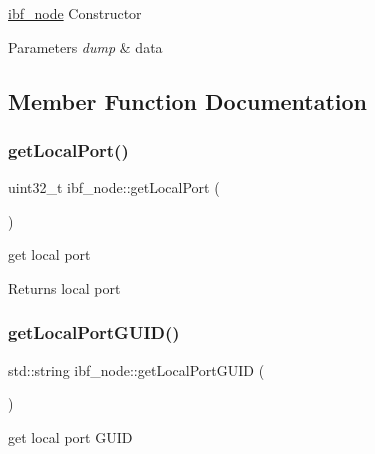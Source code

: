 \mbox{\hyperlink{classibf__node}{ibf\+\_\+node}} Constructor 


\begin{DoxyParams}{Parameters}
{\em dump} & data \\
\hline
\end{DoxyParams}


\subsection{Member Function Documentation}
\mbox{\label{classibf__node_a1edc2663a50b193be7b9a615cc288837}} 
\subsubsection{\texorpdfstring{get\+Local\+Port()}{getLocalPort()}}
{\footnotesize\ttfamily uint32\+\_\+t ibf\+\_\+node\+::get\+Local\+Port (\begin{DoxyParamCaption}{ }\end{DoxyParamCaption})\hspace{0.3cm}{\ttfamily [inline]}}



get local port 

\begin{DoxyReturn}{Returns}
local port 
\end{DoxyReturn}
\mbox{\label{classibf__node_a286ee4769949a09e9bcbdbc88d9a820c}} 
\subsubsection{\texorpdfstring{get\+Local\+Port\+G\+U\+I\+D()}{getLocalPortGUID()}}
{\footnotesize\ttfamily std\+::string ibf\+\_\+node\+::get\+Local\+Port\+G\+U\+ID (\begin{DoxyParamCaption}{ }\end{DoxyParamCaption})\hspace{0.3cm}{\ttfamily [inline]}}



get local port G\+U\+ID 

